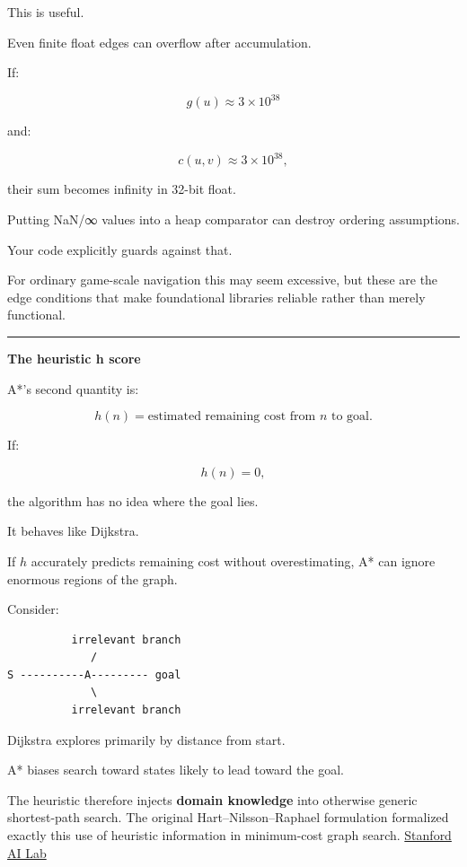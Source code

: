 This is useful.

Even finite float edges can overflow after accumulation.

If:

\[
g(u)\approx3\times10^{38}
\]

and:

\[
c(u,v)\approx3\times10^{38},
\]

their sum becomes infinity in 32-bit float.

Putting NaN/∞ values into a heap comparator can destroy ordering assumptions.

Your code explicitly guards against that.

For ordinary game-scale navigation this may seem excessive, but these are the edge conditions that make foundational libraries reliable rather than merely functional.

\begin{center}\rule{0.5\linewidth}{0.5pt}\end{center}

\textbf{The heuristic h score}

A*'s second quantity is:

\[
\boxed{
h(n)=
\text{estimated remaining cost from }n\text{ to goal}.
}
\]

If:

\[
h(n)=0,
\]

the algorithm has no idea where the goal lies.

It behaves like Dijkstra.

If \(h\) accurately predicts remaining cost without overestimating, A* can ignore enormous regions of the graph.

Consider:

\begin{verbatim}
          irrelevant branch
             /
S ----------A--------- goal
             \
          irrelevant branch
\end{verbatim}

Dijkstra explores primarily by distance from start.

A* biases search toward states likely to lead toward the goal.

The heuristic therefore injects \textbf{domain knowledge} into otherwise generic shortest-path search. The original Hart--Nilsson--Raphael formulation formalized exactly this use of heuristic information in minimum-cost graph search. \href{https://ai.stanford.edu/~nilsson/OnlinePubs-Nils/PublishedPapers/astar.pdf?utm_source=chatgpt.com}{Stanford AI Lab}

